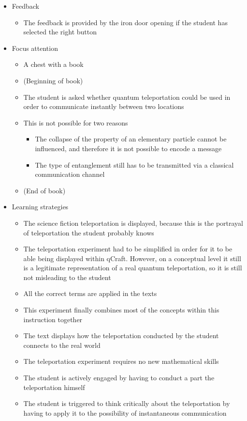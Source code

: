 \documentclass[11pt,twoside]{report} %
\begin{document}
\begin{itemize}
\begin{itemize}
		\end{itemize}
		\item Feedback
		\begin{itemize}
			\item The feedback is provided by the iron door opening if the student has selected the right button
		\end{itemize}
		\item Focus attention
		\begin{itemize}
			\item A chest with a book
			\item (Beginning of book)
			\item The student is asked whether quantum teleportation could be used in order to communicate instantly between two locations
			\item This is not possible for two reasons
			\begin{itemize}
				\item The collapse of the property of an elementary particle cannot be influenced, and therefore it is not possible to encode a message
				\item The type of entanglement still has to be transmitted via a classical communication channel
			\end{itemize}
			\item (End of book)
		\end{itemize}
		\item Learning strategies
		\begin{itemize}
			\item The science fiction teleportation is displayed, because this is the portrayal of teleportation the student probably knows
			\item The teleportation experiment had to be simplified in order for it to be able being displayed within qCraft. However, on a conceptual level it still is a legitimate representation of a real quantum teleportation, so it is still not misleading to the student
			\item All the correct terms are applied in the texts
			\item This experiment finally combines most of the concepts within this instruction together
			\item The text displays how the teleportation conducted by the student connects to the real world
			\item The teleportation experiment requires no new mathematical skills
			\item The student is actively engaged by having to conduct a part the teleportation himself
			\item The student is triggered to think critically about the teleportation by having to apply it to the possibility of instantaneous communication
		\end{itemize}
	\end{itemize}
\end{document}
